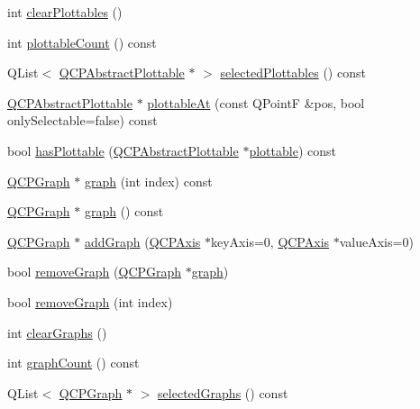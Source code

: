 \begin{DoxyCompactItemize}
\item 
int \hyperlink{classQCustomPlot_a9a409bb3201878adb7ffba1c89c4e004}{clear\+Plottables} ()
\item 
int \hyperlink{classQCustomPlot_a2dbfbf15dc38713f9a1c445a3dd2e989}{plottable\+Count} () const 
\item 
Q\+List$<$ \hyperlink{classQCPAbstractPlottable}{Q\+C\+P\+Abstract\+Plottable} $\ast$ $>$ \hyperlink{classQCustomPlot_a6721b8c689bb7f2f400987e580508fe8}{selected\+Plottables} () const 
\item 
\hyperlink{classQCPAbstractPlottable}{Q\+C\+P\+Abstract\+Plottable} $\ast$ \hyperlink{classQCustomPlot_ac1d1bc6ae4e13616fb02cef6d9e2188e}{plottable\+At} (const Q\+PointF \&pos, bool only\+Selectable=false) const 
\item 
bool \hyperlink{classQCustomPlot_a4fc28914e2ee91aab424b7ce46b6bdf1}{has\+Plottable} (\hyperlink{classQCPAbstractPlottable}{Q\+C\+P\+Abstract\+Plottable} $\ast$\hyperlink{classQCustomPlot_a32de81ff53e263e785b83b52ecd99d6f}{plottable}) const 
\item 
\hyperlink{classQCPGraph}{Q\+C\+P\+Graph} $\ast$ \hyperlink{classQCustomPlot_a6d3ed93c2bf46ab7fa670d66be4cddaf}{graph} (int index) const 
\item 
\hyperlink{classQCPGraph}{Q\+C\+P\+Graph} $\ast$ \hyperlink{classQCustomPlot_a80c40ced2a74eefe9e92de1e82ba2274}{graph} () const 
\item 
\hyperlink{classQCPGraph}{Q\+C\+P\+Graph} $\ast$ \hyperlink{classQCustomPlot_a6fb2873d35a8a8089842d81a70a54167}{add\+Graph} (\hyperlink{classQCPAxis}{Q\+C\+P\+Axis} $\ast$key\+Axis=0, \hyperlink{classQCPAxis}{Q\+C\+P\+Axis} $\ast$value\+Axis=0)
\item 
bool \hyperlink{classQCustomPlot_a903561be895fb6528a770d66ac5e6713}{remove\+Graph} (\hyperlink{classQCPGraph}{Q\+C\+P\+Graph} $\ast$\hyperlink{classQCustomPlot_a6d3ed93c2bf46ab7fa670d66be4cddaf}{graph})
\item 
bool \hyperlink{classQCustomPlot_a9554b3d2d5b10c0f884bd4010b6c192c}{remove\+Graph} (int index)
\item 
int \hyperlink{classQCustomPlot_ab0f3abff2d2f7df3668b5836f39207fa}{clear\+Graphs} ()
\item 
int \hyperlink{classQCustomPlot_a7d9b4d19114b2fde60f0233eeb0aa682}{graph\+Count} () const 
\item 
Q\+List$<$ \hyperlink{classQCPGraph}{Q\+C\+P\+Graph} $\ast$ $>$ \hyperlink{classQCustomPlot_ad2a0493bdd01e7aa99a4209ae3a5b67b}{selected\+Graphs} () const 
\item 

\end{DoxyCompactItemize}
